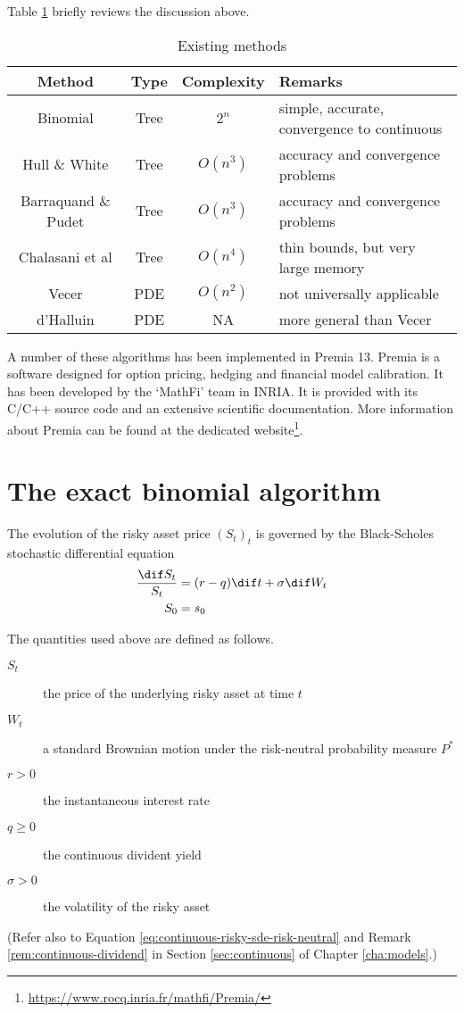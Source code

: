 Table \ref{tab:asian-literature-review} briefly reviews the discussion above.
\begin{table}[h]
	\label{tab:asian-literature-review}
	\centering
	\caption{Existing methods}
	\begin{tabular}{cccl}
		\toprule
		Method  &  Type  &  Complexity  &  Remarks  \\
		\midrule
		Binomial  &  Tree  &  $ 2^n $  &  simple, accurate, convergence to continuous  \\
		Hull \& White  &  Tree  &  $ O(n^3) $  &  accuracy and convergence problems  \\
		Barraquand \& Pudet  &  Tree  &  $ O(n^3) $  &  accuracy and convergence problems  \\
		Chalasani et al  &  Tree  &  $ O(n^4) $  &  thin bounds, but very large memory  \\
		Vecer  &  PDE  &  $ O(n^2) $  &  not universally applicable  \\
		d'Halluin  &  PDE  &  NA  &  more general than Vecer \\
		\bottomrule
	\end{tabular}
\end{table}


A number of these algorithms has been implemented in Premia 13. Premia is a software designed for option pricing, hedging and financial model calibration. It has been developed by the `MathFi' team in INRIA. It is provided with its C/C++ source code and an extensive scientific documentation. More information about Premia can be found at the dedicated  website\footnote{\url{https://www.rocq.inria.fr/mathfi/Premia/}}.


\section{The exact binomial algorithm}
The evolution of the risky asset price $ (S_t)_t $ is governed by the Black-Scholes stochastic differential equation
\begin{subequations}
	\begin{align*}
		\frac{\dif S_t}{S_t}  &=  (r - q) \dif t + \sigma \dif W_t  \\
		S_0  &=  s_0
	\end{align*}
\end{subequations}

The quantities used above are defined as follows.
\begin{description}
	\item[$ S_t $] the price of the underlying risky asset at time $ t $
	\item[$ W_t $] a standard Brownian motion under the risk-neutral probability measure $ P^* $
	\item[$ r > 0 $] the instantaneous interest rate
	\item[$ q \ge 0 $] the continuous divident yield
	\item[$ \sigma > 0 $] the volatility of the risky asset
\end{description}
(Refer also to Equation \ref{eq:continuous-risky-sde-risk-neutral} and Remark \ref{rem:continuous-dividend} in Section \ref{sec:continuous} of Chapter \ref{cha:models}.)

